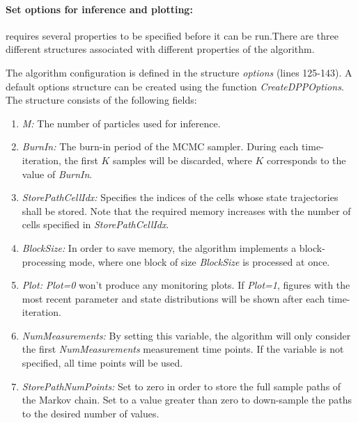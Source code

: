 \documentclass[a4paper, 9pt]{scrartcl}
\begin{document}
\paragraph{Set options for inference and plotting:}

\DPP requires several properties to be specified before it can be run.There are three different structures associated with different properties of the algorithm. \newline

The algorithm configuration is defined in the structure \textit{options} (lines 125-143). A default options structure can be created using the function \textit{CreateDPPOptions}. The structure consists of the following fields:
\begin{enumerate}
	\item \textit{M:} The number of particles used for inference.
	\item \textit{BurnIn:} The burn-in period of the MCMC sampler. During each time-iteration, the first $K$ samples will be discarded, where $K$ corresponds to the value of \textit{BurnIn}.
	\item \textit{StorePathCellIdx:} Specifies the indices of the cells whose state trajectories shall be stored. Note that the required memory increases with the number of cells specified in \textit{StorePathCellIdx}.
	\item \textit{BlockSize:} In order to save memory, the algorithm implements a block-processing mode, where one block of size \textit{BlockSize} is processed at once.
	\item \textit{Plot:} \textit{Plot=0} won't produce any monitoring plots. If \textit{Plot=1}, figures with the most recent parameter and state distributions will be shown after each time-iteration. 
	\item \textit{NumMeasurements:} By setting this variable, the algorithm will only consider the first \textit{NumMeasurements} measurement time points. If the variable is not specified, all time points will be used.
	\item \textit{StorePathNumPoints:} Set to zero in order to store the full sample paths of the Markov chain. Set to a value greater than zero to down-sample the paths to the desired number of values.
\end{enumerate}
\end{document}
